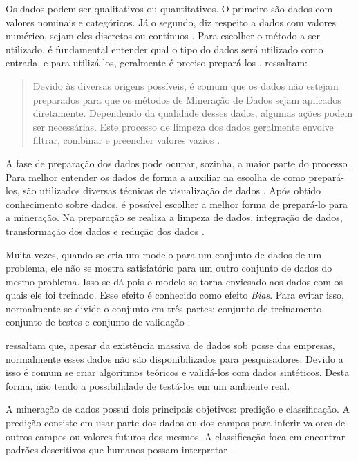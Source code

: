 Os dados podem ser qualitativos ou quantitativos. O primeiro são dados com valores nominais e categóricos. Já o segundo, diz respeito a dados com valores numérico, sejam eles discretos ou contínuos \cite{camilo2009mineraccao}. Para escolher o método a ser utilizado, é fundamental entender qual o tipo do dados será utilizado como entrada, e para utilizá-los, geralmente é preciso prepará-los \cite{camilo2009mineraccao}.  ressaltam:

\begin{quote}
    Devido às diversas origens possíveis, é comum que os dados não estejam preparados para que os métodos de Mineração de Dados sejam aplicados diretamente. Dependendo da qualidade desses dados, algumas ações podem ser necessárias. Este processo de limpeza dos dados geralmente envolve filtrar, combinar e preencher valores vazios
    \cite[p.~4]{camilo2009mineraccao}.
\end{quote}

A fase de preparação dos dados pode ocupar, sozinha, a maior parte do processo \cite{camilo2009mineraccao}. Para melhor entender os dados de forma a auxiliar na escolha de como prepará-los, são utilizados diversas técnicas de visualização de dados \cite{camilo2009mineraccao}. Após obtido conhecimento sobre dados, é possível escolher a melhor forma de prepará-lo para a mineração. Na preparação se realiza a limpeza de dados, integração de dados, transformação dos dados e redução dos dados \cite{han2011data}.

Muita vezes, quando se cria um modelo para um conjunto de dados de um problema, ele não se mostra satisfatório para um outro conjunto de dados do mesmo problema. Isso se dá pois o modelo se torna enviesado aos dados com os quais ele foi treinado. Esse efeito é conhecido como efeito \textit{Bias}. Para evitar isso, normalmente se divide o conjunto em três partes: conjunto de treinamento, conjunto de testes e conjunto de validação \cite{camilo2009mineraccao}.

 ressaltam que, apesar da existência massiva de dados sob posse das empresas, normalmente esses dados não são disponibilizados para pesquisadores. Devido a isso é comum se criar algoritmos teóricos e validá-los com dados sintéticos. Desta forma, não tendo a possibilidade de testá-los em um ambiente real.

A mineração de dados possui dois principais objetivos: predição e classificação. A predição consiste em usar parte dos dados ou dos campos para inferir valores de outros campos ou valores futuros dos mesmos. A classificação foca em encontrar padrões descritivos que humanos possam interpretar \cite{fayyad1996data}. 

